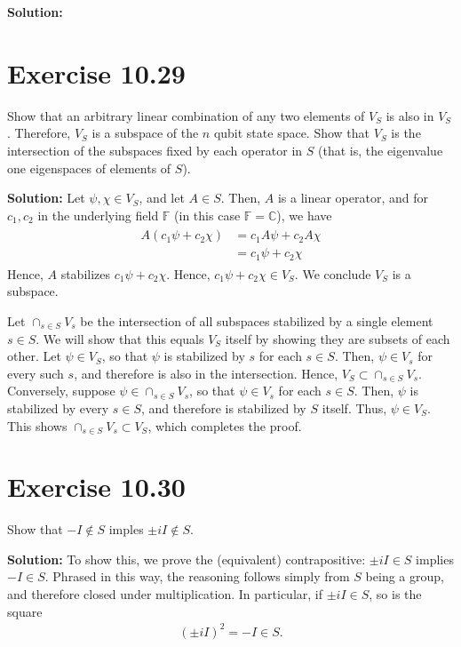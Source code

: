 \documentclass{book}
\begin{document}
    \textbf{Solution:}
    
\section*{Exercise 10.29}
    Show that an arbitrary linear combination of any two elements of $V_S$ is also in $V_S$ . Therefore, $V_S$ is a subspace of the $n$ qubit state space. Show that $V_S$ is the intersection of the subspaces fixed by each operator in $S$ (that is, the eigenvalue one eigenspaces of elements of $S$).
    
    \textbf{Solution:} Let $\psi, \chi \in V_S$, and let $A \in S$. Then, $A$ is a linear operator, and for $c_1, c_2$ in the underlying field $\mathbb{F}$ (in this case $\mathbb{F}=\mathbb{C}$), we have
    \begin{align}
    \begin{aligned}
        A\left(c_1\psi + c_2\chi\right) &= c_1 A\psi + c_2 A\chi \\
        &=c_1\psi + c_2 \chi
    \end{aligned}
    \end{align}
    Hence, $A$ stabilizes $c_1\psi + c_2\chi$. Hence, $c_1\psi + c_2 \chi\in V_S$. We conclude $V_S$ is a subspace. 
    
    Let $\cap_{s\in S} V_s$ be the intersection of all subspaces stabilized by a single element $s\in S$. We will show that this equals $V_S$ itself by showing they are subsets of each other. Let $\psi \in V_S$, so that $\psi$ is stabilized by $s$ for each $s\in S$. Then, $\psi\in V_s$ for every such $s$, and therefore is also in the intersection. Hence, $V_S \subset \cap_{s\in S} V_s$. Conversely, suppose $\psi \in \cap_{s\in S} V_s$, so that $\psi\in V_s$ for each $s\in S$. Then, $\psi$ is stabilized by every $s \in S$, and therefore is stabilized by $S$ itself. Thus, $\psi \in V_S$. This shows $\cap_{s\in S} V_s \subset V_S$, which completes the proof.
    
\section*{Exercise 10.30}
    Show that $-I \notin S$ imples $\pm i I \notin S$.
    
    \textbf{Solution:} To show this, we prove the (equivalent) contrapositive: $\pm i I \in S$ implies $-I \in S$. Phrased in this way, the reasoning follows simply from $S$ being a group, and therefore closed under multiplication. In particular, if $\pm i I \in S$, so is the square
    \begin{align}
        (\pm i I)^2 = -I \in S.
    \end{align}
\end{document}
